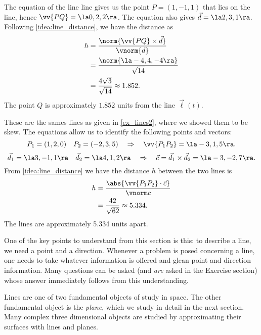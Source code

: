 {The equation of the line line gives us the point $P=(1,-1,1)$ that lies on the line, hence $\vv{PQ} = \la 0,2,2\ra$. The equation also gives $\vec d= \la 2,3,1\ra$. Following \autoref{idea:line_distance}, we have the distance as 
\begin{align*}
h &= \frac{\norm{\vv{PQ}\times \vec d}}{\vnorm{d}}\\
	&= \frac{\norm{\la -4,4,-4\ra}}{\sqrt{14}}\\
	&=\frac{4\sqrt{3}}{\sqrt{14}} \approx 1.852.
\end{align*}
The point $Q$ is approximately $1.852$ units from the line $\vec\ell(t)$.}

{These are the sames lines as given in \autoref{ex_lines2}, where we showed them to be skew. The equations allow us to identify the following points and vectors:
$$P_1 = (1,2,0)\quad P_2 = (-2,3,5) \quad \Rightarrow \quad \vv{P_1P_2} = \la -3,1,5\ra.$$
$$\vec d_1 = \la 3,-1,1\ra \quad \vec d_2 = \la 4,1,2\ra \quad \Rightarrow \quad \vec c = \vec d_1\times \vec d_2 = \la -3,-2,7\ra.$$
From \autoref{idea:line_distance} we have the distance $h$ between the two lines is
\begin{align*}
h &= \frac{\abs{\vv{P_1P_2}\cdot \vec c}}{\vnorm c}\\
&=\frac{42}{\sqrt{62}} \approx 5.334.
\end{align*}
The lines are approximately 5.334 units apart.}

One of the key points to understand from this section is this: to describe a line, we need a point and a direction. Whenever a problem is posed concerning a line, one  needs to take whatever information is offered and glean point and direction information. Many questions can be asked (and \emph{are} asked in the Exercise section) whose answer immediately follows from this understanding. 

Lines are one of two fundamental objects of study in space. The other fundamental object is the \emph{plane}, which we study in detail in the next section. Many complex three dimensional objects are studied by approximating their surfaces with lines and planes.

